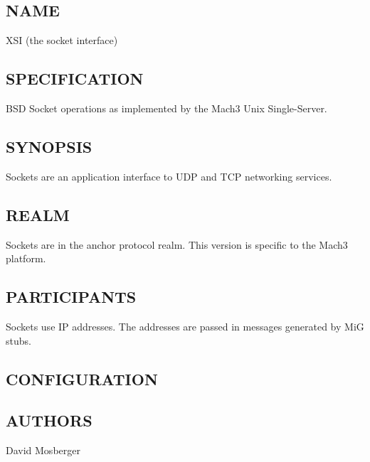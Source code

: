 %
%
%

\subsection*{NAME}

\noindent XSI (the \xk{} socket interface)

\subsection*{SPECIFICATION}

\noindent BSD Socket operations as implemented by the Mach3 Unix Single-Server.

\subsection*{SYNOPSIS}

\noindent Sockets are an application interface to UDP and TCP networking
services.

\subsection*{REALM}

Sockets are in the anchor protocol realm.  This version is specific
to the Mach3 platform.

\subsection*{PARTICIPANTS}

Sockets use IP addresses.  The addresses are passed in messages generated
by MiG stubs.


\subsection*{CONFIGURATION}


\subsection*{AUTHORS}

\noindent David Mosberger
